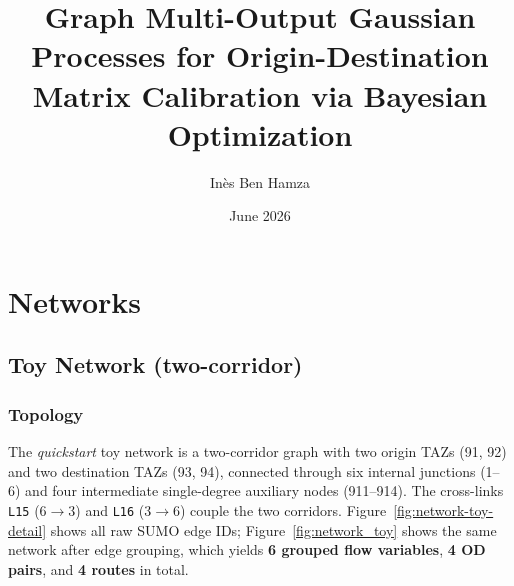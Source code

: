 \documentclass[11pt]{article}
\title{Graph Multi-Output Gaussian Processes for Origin-Destination Matrix Calibration via Bayesian Optimization}
\author{Inès Ben Hamza}
\date{June 2026}
\begin{document}
\section{Networks}
\subsection{Toy Network (two-corridor)}
\label{app:network_toy}


\subsubsection*{Topology}

The \emph{quickstart} toy network is a two-corridor graph with two origin TAZs
(91, 92) and two destination TAZs (93, 94), connected through six internal
junctions (1--6) and four intermediate single-degree auxiliary nodes
(911--914). The cross-links \texttt{L15} ($6 \to 3$) and \texttt{L16}
($3 \to 6$) couple the two corridors. 
Figure~\ref{fig:network-toy-detail} shows all raw SUMO edge IDs;
Figure~\ref{fig:network_toy} shows the same network after edge grouping, which
yields \textbf{6 grouped flow variables}, \textbf{4 OD pairs}, and \textbf{4
routes} in total.
\end{document}
